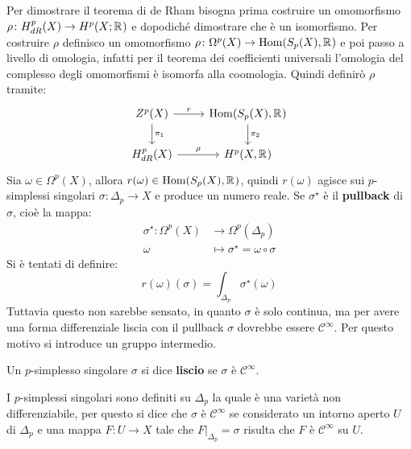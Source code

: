 Per dimostrare il teorema di de Rham bisogna prima costruire un omomorfismo
$ \rho \colon H^p_{dR}(X) \to H^p(X;\mathbb{R}^{}) $ e dopodiché dimostrare che è un isomorfismo.
Per costruire $ \rho $ definisco un omomorfismo $ \rho \colon \Omega^p(X) \to \mathrm{Hom}( S_p(X), \mathbb{R}^{}) $
e poi passo a livello di omologia, infatti per il teorema dei coefficienti
universali l'omologia del complesso degli omomorfismi è isomorfa alla coomologia.
Quindi definirò $ \rho $ tramite:
\[
  \begin{tikzcd}
    Z^p(X) \rar{r} \dar{\pi_1} & \hom{S_p(X), \RN{}} \dar{\pi_2} \\
    H^p_{dR}(X) \rar{\rho} & H^p(X, \RN{})
  \end{tikzcd}
\]
Sia $ \omega \in \Omega^p(X) $, allora $ r(\omega) \in \mathrm{Hom}( S_p(X), \mathbb{R}^{}) $, quindi $ r(\omega) $ agisce
sui $ p $-simplessi singolari $ \sigma \colon \Delta_p \to X $ e produce un numero reale.
Se $ \sigma^\star $ è il \textbf{pullback} di $ \sigma $, cioè la mappa:
\begin{align*}
  \sigma^\star \colon \Omega^p(X) & \to \Omega^p(\Delta_p) \\
  \omega & \mapsto \sigma^\star = \omega \circ \sigma
\end{align*}
Si è tentati di definire:
\[
  r(\omega)(\sigma) = \int_{\Delta_p} \sigma^\star(\omega)
\]
Tuttavia questo non sarebbe sensato, in quanto $ \sigma $ è solo continua, ma per
avere una forma differenziale liscia con il pullback $ \sigma $ dovrebbe essere $ \mathcal{C}^\infty $.
Per questo motivo si introduce un gruppo intermedio.
\begin{definition}
  Un $ p $-simplesso singolare $ \sigma $ si dice \textbf{liscio}
  se $ \sigma $ è $ \mathcal{C}^\infty $.
\end{definition}
\begin{osservation}
  I $ p $-simplessi singolari sono definiti su $ \Delta_p $ la quale è una varietà
  non differenziabile, per questo si dice che $ \sigma $ è
  $ \mathcal{C}^\infty $ se considerato un intorno aperto $ U $ di $ \Delta_p $ e una
  mappa $ F \colon U \to X $ tale che $ F\lvert_{\Delta_p} = \sigma $ risulta che
  $ F $ è $ \mathcal{C}^\infty $ su $ U $.
\end{osservation}
